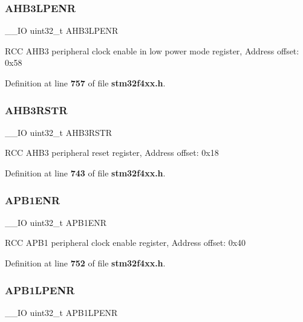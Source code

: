 \subsubsection{A\+H\+B3\+L\+P\+E\+NR}
{\footnotesize\ttfamily \+\_\+\+\_\+\+IO uint32\+\_\+t A\+H\+B3\+L\+P\+E\+NR}

R\+CC A\+H\+B3 peripheral clock enable in low power mode register, Address offset\+: 0x58 

Definition at line \textbf{ 757} of file \textbf{ stm32f4xx.\+h}.

\mbox{\label{structRCC__TypeDef_a28560c5bfeb45326ea7f2019dba57bea}} 
\subsubsection{A\+H\+B3\+R\+S\+TR}
{\footnotesize\ttfamily \+\_\+\+\_\+\+IO uint32\+\_\+t A\+H\+B3\+R\+S\+TR}

R\+CC A\+H\+B3 peripheral reset register, Address offset\+: 0x18 

Definition at line \textbf{ 743} of file \textbf{ stm32f4xx.\+h}.

\mbox{\label{structRCC__TypeDef_ac88901e2eb35079b7b58a185e6bf554c}} 
\subsubsection{A\+P\+B1\+E\+NR}
{\footnotesize\ttfamily \+\_\+\+\_\+\+IO uint32\+\_\+t A\+P\+B1\+E\+NR}

R\+CC A\+P\+B1 peripheral clock enable register, Address offset\+: 0x40 

Definition at line \textbf{ 752} of file \textbf{ stm32f4xx.\+h}.

\mbox{\label{structRCC__TypeDef_ad85a9951a7be79fe08ffc90f796f071b}} 
\subsubsection{A\+P\+B1\+L\+P\+E\+NR}
{\footnotesize\ttfamily \+\_\+\+\_\+\+IO uint32\+\_\+t A\+P\+B1\+L\+P\+E\+NR}

